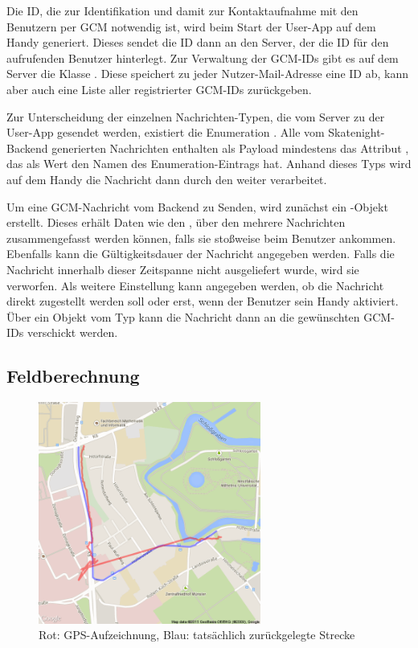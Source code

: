 Die ID, die zur Identifikation und damit zur Kontaktaufnahme mit den Benutzern per GCM notwendig ist, wird beim Start der User-App auf dem Handy generiert. Dieses sendet die ID dann an den Server, der die ID für den aufrufenden Benutzer hinterlegt. Zur Verwaltung der GCM-IDs gibt es auf dem Server die Klasse . Diese speichert zu jeder Nutzer-Mail-Adresse eine ID ab, kann aber auch eine Liste aller registrierter GCM-IDs zurückgeben.

Zur Unterscheidung der einzelnen Nachrichten-Typen, die vom Server zu der User-App gesendet werden, existiert die Enumeration . Alle vom Skatenight-Backend generierten Nachrichten enthalten als Payload mindestens das Attribut , das als Wert den Namen des Enumeration-Eintrags hat. Anhand dieses Typs wird auf dem Handy die Nachricht dann durch den  weiter verarbeitet.

Um eine GCM-Nachricht vom Backend zu Senden, wird zunächst ein -Objekt erstellt. Dieses erhält Daten wie den , über den mehrere Nachrichten zusammengefasst werden können, falls sie stoßweise beim Benutzer ankommen. Ebenfalls kann die Gültigkeitsdauer der Nachricht angegeben werden. Falls die Nachricht innerhalb dieser Zeitspanne nicht ausgeliefert wurde, wird sie verworfen. Als weitere Einstellung kann angegeben werden, ob die Nachricht direkt zugestellt werden soll oder erst, wenn der Benutzer sein Handy aktiviert. Über ein Objekt vom Typ  kann die Nachricht dann an die gewünschten GCM-IDs verschickt werden.

\subsection{Feldberechnung}
\label{subsec:Feldberechnung}

\begin{figure}[htb]
\centering
\includegraphics[width=0.65\textwidth]{graphics/Feldberechnung.png}
\caption{Rot: GPS-Aufzeichnung, Blau: tatsächlich zurückgelegte Strecke}
\label{fig:feldberechnung}
\end{figure}

